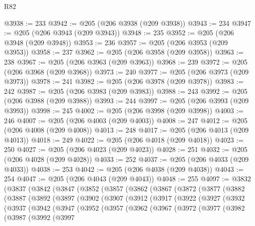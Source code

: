\begin{lexlean}{R82}
\begin{coremodule}
@3938 := 233
@3942 := @205 (@206 @3938 (@209 @3938))
@3943 := 234
@3947 := @205 (@206 @3943 (@209 @3943))
@3948 := 235
@3952 := @205 (@206 @3948 (@209 @3948))
@3953 := 236
@3957 := @205 (@206 @3953 (@209 @3953))
@3958 := 237
@3962 := @205 (@206 @3958 (@209 @3958))
@3963 := 238
@3967 := @205 (@206 @3963 (@209 @3963))
@3968 := 239
@3972 := @205 (@206 @3968 (@209 @3968))
@3973 := 240
@3977 := @205 (@206 @3973 (@209 @3973))
@3978 := 241
@3982 := @205 (@206 @3978 (@209 @3978))
@3983 := 242
@3987 := @205 (@206 @3983 (@209 @3983))
@3988 := 243
@3992 := @205 (@206 @3988 (@209 @3988))
@3993 := 244
@3997 := @205 (@206 @3993 (@209 @3993))
@3998 := 245
@4002 := @205 (@206 @3998 (@209 @3998))
@4003 := 246
@4007 := @205 (@206 @4003 (@209 @4003))
@4008 := 247
@4012 := @205 (@206 @4008 (@209 @4008))
@4013 := 248
@4017 := @205 (@206 @4013 (@209 @4013))
@4018 := 249
@4022 := @205 (@206 @4018 (@209 @4018))
@4023 := 250
@4027 := @205 (@206 @4023 (@209 @4023))
@4028 := 251
@4032 := @205 (@206 @4028 (@209 @4028))
@4033 := 252
@4037 := @205 (@206 @4033 (@209 @4033))
@4038 := 253
@4042 := @205 (@206 @4038 (@209 @4038))
@4043 := 254
@4047 := @205 (@206 @4043 (@209 @4043))
@4048 := 255
@4097 := @3832
    (@3837
      (@3842
        (@3847
          (@3852
            (@3857
              (@3862
                (@3867
                  (@3872
                    (@3877
                      (@3882
                        (@3887
                          (@3892
                            (@3897
                              (@3902
                                (@3907
                                  (@3912
                                    (@3917
                                      (@3922
                                        (@3927
                                          (@3932
                                            (@3937
                                              (@3942
                                                (@3947
                                                  (@3952
                                                    (@3957
                                                      (@3962
                                                        (@3967
                                                          (@3972
                                                            (@3977
                                                              (@3982
                                                                (@3987
                                                                  (@3992
                                                                    (@3997

\end{coremodule}
\end{lexlean}

